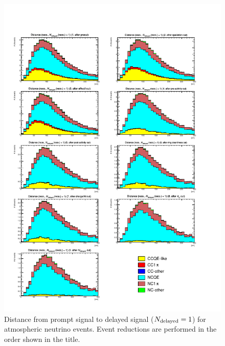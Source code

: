 \begin{figure}[h]
	\centering
	\includegraphics[width=15cm]{PDF/Dist_ATM/Che_50deg_tag_ge1/All/RecoDisCap_1}
	\caption[Distance from prompt signal to delayed signal ($N_{\rm delayed}=1$) for atmospheric neutrino events]{
	Distance from prompt signal to delayed signal ($N_{\rm delayed}=1$) for atmospheric neutrino events.
	Event reductions are performed in the order shown in the title.
	}\label{ATM_RecoDisCap_1}
\end{figure}

